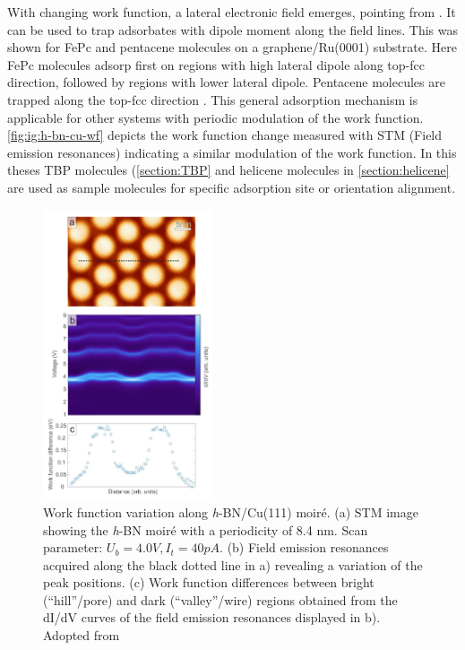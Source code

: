 With changing work function, a lateral electronic field emerges, pointing from \underline{\qquad \qquad}. It can be used to trap adsorbates with dipole moment along the field lines. This was shown for FePc and pentacene molecules on a graphene/Ru(0001) substrate. Here FePc molecules adsorp first on regions with high lateral dipole along top-fcc direction, followed by regions with lower lateral dipole. Pentacene molecules are trapped along the top-fcc direction \cite{zhang_assembly_2011}. This general adsorption mechanism is applicable for other systems with periodic modulation of the work function. \autoref{fig:ig:h-bn-cu-wf} depicts the work function change measured  with STM (Field emission resonances) indicating a similar modulation of the work function. In this theses TBP molecules (\autoref{section:TBP} and helicene molecules in \autoref{section:helicene} are used as sample molecules for specific adsorption site or orientation alignment.
\begin{figure}\centering
	\includegraphics[width=5cm]{./images/h-BN-Cu(111)-wf-change}
	\caption{Work function variation along \textit{h}-BN/Cu(111) moir\'e. (a) STM image showing the \textit{h}-BN moir\'e with a periodicity of 8.4 nm. Scan parameter: $U_b= 4.0 V, I_t= 40 pA$. (b)	Field emission resonances acquired along the black dotted line in a) revealing a variation of the peak positions. (c) Work  function  differences  between bright  (“hill”/pore)  and  dark  (“valley”/wire)  regions obtained  from  the  dI/dV curves  of  the  field emission  resonances  displayed  in  b). Adopted from \cite{schwarz_corrugation_2017}}
	\label{fig:h-bn-cu-wf}
\end{figure}
